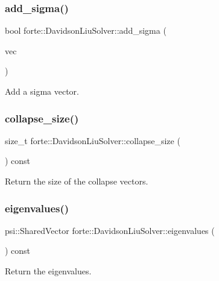 \subsubsection{\texorpdfstring{add\+\_\+sigma()}{add\_sigma()}}
{\footnotesize\ttfamily bool forte\+::\+Davidson\+Liu\+Solver\+::add\+\_\+sigma (\begin{DoxyParamCaption}\item[{psi\+::\+Shared\+Vector}]{vec }\end{DoxyParamCaption})}



Add a sigma vector. 

\mbox{\label{classforte_1_1_davidson_liu_solver_af68b3caa5e37a93261b13cbdd7006ecf}} 
\subsubsection{\texorpdfstring{collapse\+\_\+size()}{collapse\_size()}}
{\footnotesize\ttfamily size\+\_\+t forte\+::\+Davidson\+Liu\+Solver\+::collapse\+\_\+size (\begin{DoxyParamCaption}{ }\end{DoxyParamCaption}) const}



Return the size of the collapse vectors. 

\mbox{\label{classforte_1_1_davidson_liu_solver_ac35bcdec2a59ab95da00f27453bfb0fe}} 
\subsubsection{\texorpdfstring{eigenvalues()}{eigenvalues()}}
{\footnotesize\ttfamily psi\+::\+Shared\+Vector forte\+::\+Davidson\+Liu\+Solver\+::eigenvalues (\begin{DoxyParamCaption}{ }\end{DoxyParamCaption}) const}



Return the eigenvalues. 

